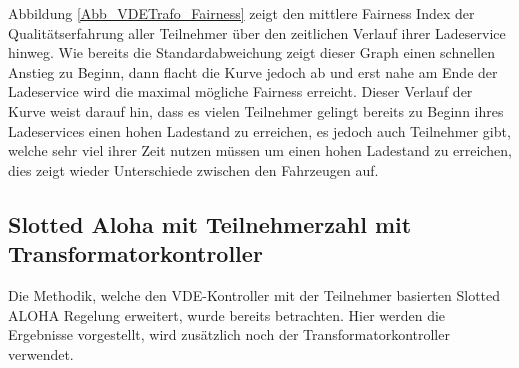 Abbildung \ref{Abb_VDETrafo_Fairness} zeigt den mittlere Fairness Index der Qualitätserfahrung aller Teilnehmer über den zeitlichen Verlauf ihrer Ladeservice hinweg. Wie bereits die Standardabweichung zeigt dieser Graph einen schnellen Anstieg zu Beginn, dann flacht die Kurve jedoch ab und erst nahe am Ende der Ladeservice wird die maximal mögliche Fairness erreicht. Dieser Verlauf der Kurve weist darauf hin, dass es vielen Teilnehmer gelingt bereits zu Beginn ihres Ladeservices einen hohen Ladestand zu erreichen, es jedoch auch Teilnehmer gibt, welche sehr viel ihrer Zeit nutzen müssen um einen hohen Ladestand zu erreichen, dies zeigt wieder Unterschiede zwischen den Fahrzeugen auf.

\subsection{Slotted Aloha mit Teilnehmerzahl mit Transformatorkontroller}
\label{chap_SAparT}
Die Methodik, welche den VDE-Kontroller mit der Teilnehmer basierten Slotted ALOHA Regelung erweitert, wurde bereits betrachten. Hier werden die Ergebnisse vorgestellt, wird zusätzlich noch der Transformatorkontroller verwendet.
